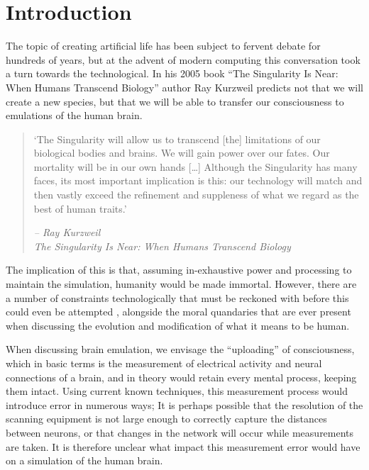 \chapter{Introduction}


The topic of creating artificial life has been subject to fervent debate for
hundreds of years, but at the advent of modern computing this conversation took
a turn towards the technological. In his 2005 book “The Singularity Is Near:
When Humans Transcend Biology” author Ray Kurzweil predicts not that we will
create a new species, but that we will be able to transfer our
consciousness to emulations of the human brain.\autocite{kurzweil_singularity_2006}

\begin{quote}
      `The Singularity will allow us to transcend [the] limitations of our
      biological bodies and brains. We will gain power over our fates. Our
      mortality will be in our own hands [\ldots] Although the Singularity has many faces, its most important implication is this: our technology will match and then vastly exceed the refinement and suppleness of what we regard as the best of human traits.'
\begin{flushright}
      \textit{-- Ray Kurzweil \\ The Singularity Is Near: When Humans Transcend Biology
      }
  \end{flushright}
\end{quote}  

The implication of this is
that, assuming in-exhaustive power and processing to maintain the simulation,
humanity would be made immortal. However, there are a number of constraints
technologically that must be reckoned with before this could even be attempted
\parencite{bostrom_whole_2008}, alongside the moral quandaries that are ever
present when discussing the evolution and modification of what it means to be
human.

When discussing brain emulation, we envisage the “uploading” of consciousness,
which in basic terms is the measurement of electrical activity and neural
connections of a brain, and in theory would retain every mental process, keeping
them intact. Using current known techniques, this measurement process would
introduce error in numerous ways; It is perhaps possible that the resolution of
the scanning equipment is not large enough to correctly capture the distances
between neurons, or that changes in the network will occur while measurements
are taken. It is therefore unclear what impact this measurement error would have
on a simulation of the human brain.

